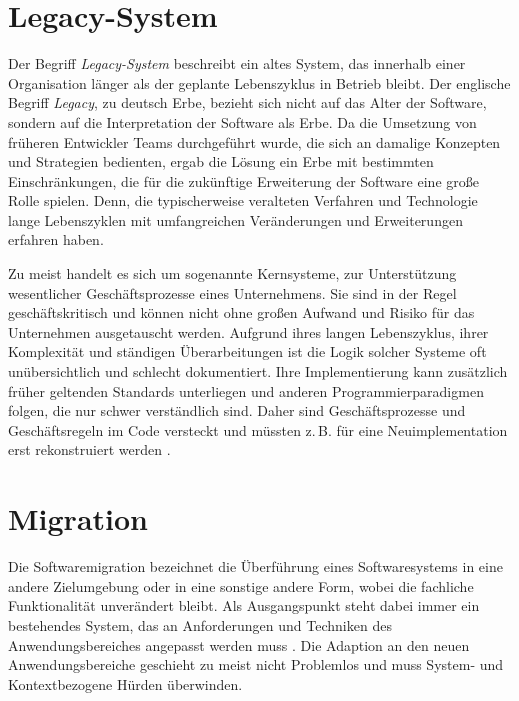 \section{Legacy-System}

	Der Begriff \textit{Legacy-System} beschreibt ein altes System, das innerhalb einer Organisation länger als der geplante Lebenszyklus in Betrieb bleibt. Der englische Begriff \textit{Legacy}, zu deutsch Erbe, bezieht sich nicht auf das Alter der Software, sondern auf die Interpretation der Software als Erbe. Da die Umsetzung von früheren Entwickler Teams durchgeführt wurde, die sich an damalige Konzepten und Strategien bedienten, ergab die Lösung ein Erbe mit bestimmten Einschränkungen, die für die zukünftige Erweiterung der Software eine große Rolle spielen. Denn, die typischerweise veralteten Verfahren und Technologie lange Lebenszyklen mit umfangreichen Veränderungen und Erweiterungen erfahren haben\cite{sneed2016softwaremigration}. \bigbreak

	Zu meist handelt es sich um sogenannte Kernsysteme, zur Unterstützung wesentlicher Geschäftsprozesse eines Unternehmens. Sie sind in der Regel geschäftskritisch und können nicht ohne großen Aufwand und Risiko für das Unternehmen ausgetauscht werden. Aufgrund ihres langen Lebenszyklus, ihrer Komplexität und ständigen Überarbeitungen ist die Logik solcher Systeme oft unübersichtlich und schlecht dokumentiert. Ihre Implementierung kann zusätzlich früher geltenden Standards unterliegen und anderen Programmierparadigmen folgen, die nur schwer verständlich sind. Daher sind Geschäftsprozesse und Geschäftsregeln im Code versteckt und müssten z.\,B. für eine Neuimplementation erst rekonstruiert werden \cite{martens2016ablosung}.

\section{Migration} \label{ssub:migration}

	Die Softwaremigration bezeichnet die Überführung eines Softwaresystems in eine andere Zielumgebung oder in eine sonstige andere Form, wobei die fachliche Funktionalität unverändert bleibt. Als Ausgangspunkt steht dabei immer ein bestehendes System, das an Anforderungen und Techniken des Anwendungsbereiches angepasst werden muss \cite{sneed2016softwaremigration}. Die Adaption an den neuen Anwendungsbereiche geschieht zu meist nicht Problemlos und muss System- und Kontextbezogene Hürden überwinden. 


